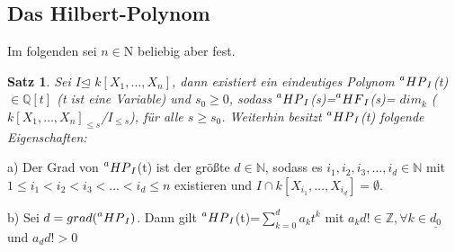 \documentclass{article}
\newtheorem{satz}{Satz}
\newcommand*{\R}{k[X_{1},\ldots,X_{n}]}
\newcommand*{\indx}[2]{{#1}_{#2}}
\newcommand*{\hf}[1]{$\prescript{a}{}{HF}_{#1}$}
\newcommand*{\hp}[1]{$\prescript{a}{}{HP}_{#1}$}
\newcommand*{\kette}[2]{$1\leq {#1}_1<{#1}_2<{#1}_3<...<{#1}_{#2}\leq n$}
\newcommand*{\dkette}[2]{${#1}_1,{#1}_2,{#1}_3,\ldots,{#1}_{#2} \in \mathbb{N}$}
\newcommand*{\ideal}{$I$}
\begin{document}
\subsection{Das Hilbert-Polynom}

Im folgenden sei $n \in \mathrm{N}$ beliebig aber fest.

\begin{satz}
	\label{1.2.14}
	Sei  \ideal $\unlhd$ $\R$, dann existiert ein eindeutiges Polynom \hp{I}(t) $\in \mathbb{Q}[t]$ (t ist eine Variable) und $\indx{s}{0}\geq0$,  sodass \hp{I}(s)=\hf{I}(s)= $\indx{dim}{k}$ ($\indx{\R}{\leq s}$/$\indx{I}{\leq s}$), für alle $ s\geq\indx{s}{0}$. Weiterhin besitzt \hp{I}(t) folgende Eigenschaften:	
\end{satz}
\begin{compactenum}
	\item[a)] Der Grad von \hp{I}(t) ist der größte $d \in \mathbb{N}$, sodass es \dkette{i}{d} mit \kette{i}{d} existieren und $I\cap k[X_{{i}_{1}},\ldots,X_{{i}_{d}}]={\emptyset}$.
	\item[b)] Sei $d=grad(\textnormal{\hp{I}})$. Dann gilt \hp{I}(t)=$\sum_{k=0}^{d} \indx{a}{k}t^k$ mit $\indx{a}{k}d! \in \mathbb{Z}, \forall k\in \underline{\indx{d}{0}}$ und $\indx{a}{d}d!>0$
\end{compactenum}
\end{document}
